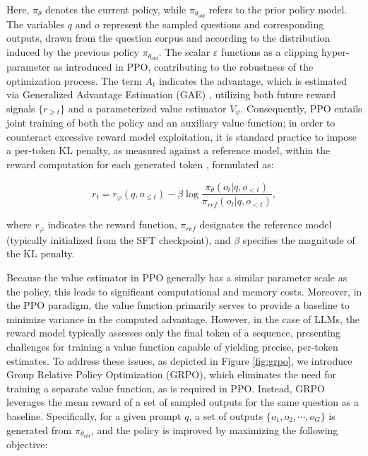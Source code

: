 Here, $\pi_{\theta}$ denotes the current policy, while $\pi_{\theta_{old}}$ refers to the prior policy model. The variables $q$ and $o$ represent the sampled questions and corresponding outputs, drawn from the question corpus and according to the distribution induced by the previous policy $\pi_{\theta_{old}}$. The scalar $\varepsilon$ functions as a clipping hyper-parameter as introduced in PPO, contributing to the robustness of the optimization process. The term $A_t$ indicates the advantage, which is estimated via Generalized Advantage Estimation (GAE) \citep{gae}, utilizing both future reward signals $\{r_{\ge t}\}$ and a parameterized value estimator $V_{\psi}$. Consequently, PPO entails joint training of both the policy and an auxiliary value function; in order to counteract excessive reward model exploitation, it is standard practice to impose a per-token KL penalty, as measured against a reference model, within the reward computation for each generated token \citep{ouyang2022training}, formulated as:

\begin{equation}
    r_{t} = r_\varphi(q, o_{\le t}) - \beta \log\frac{\pi_{\theta}(o_{t}|q, o_{<t})}{\pi_{ref}(o_{t}|q, o_{<t})},
\label{eq:PPO-reward}
\end{equation}

where $r_\varphi$ indicates the reward function, $\pi_{ref}$ designates the reference model (typically initialized from the SFT checkpoint), and $\beta$ specifies the magnitude of the KL penalty.

Because the value estimator in PPO generally has a similar parameter scale as the policy, this leads to significant computational and memory costs. Moreover, in the PPO paradigm, the value function primarily serves to provide a baseline to minimize variance in the computed advantage. However, in the case of LLMs, the reward model typically assesses only the final token of a sequence, presenting challenges for training a value function capable of yielding precise, per-token estimates. To address these issues, as depicted in Figure \ref{fig:grpo}, we introduce Group Relative Policy Optimization (GRPO), which eliminates the need for training a separate value function, as is required in PPO. Instead, GRPO leverages the mean reward of a set of sampled outputs for the same question as a baseline. Specifically, for a given prompt $q$, a set of outputs $\{o_1, o_2, \cdots, o_G\}$ is generated from $\pi_{\theta_{old}}$, and the policy is improved by maximizing the following objective:

